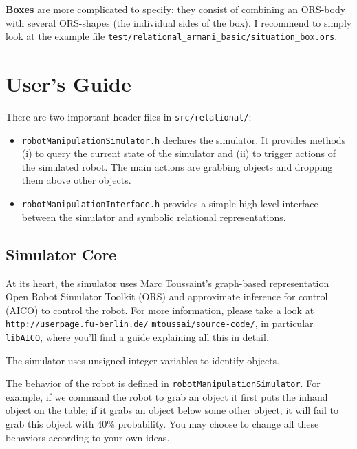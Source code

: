 \documentclass[10pt,twoside,twocolumn,fleqn]{article}
\begin{document}
\textbf{Boxes} are more complicated to specify: they consist of
combining an ORS-body with several ORS-shapes (the individual sides of
the box). I recommend to simply look at the example file
\texttt{test/relational\_armani\_basic/situation\_box.ors}.




\section{User's Guide}

There are two important header files in \texttt{src/relational/}:
\begin{itemize}
\item \texttt{robotManipulationSimulator.h} declares the simulator. It
provides methods (i) to query the current state of the simulator and
(ii) to trigger actions of the simulated robot. The main actions are
grabbing objects and dropping them above other objects.

\item \texttt{robotManipulationInterface.h} provides a simple high-level
interface between the simulator and symbolic relational representations.
\end{itemize}



\subsection{Simulator Core}

At its heart, the simulator uses Marc Toussaint's graph-based
representation Open Robot Simulator Toolkit (ORS) and approximate
inference for control (AICO) \citep{toussaint:09-icml} to control the
robot. For more information, please take a look at 
\texttt{http://userpage.fu-berlin.de/}
\texttt{mtoussai/source-code/}, in
particular \texttt{libAICO}, where you'll find a guide explaining all
this in detail.

The simulator uses unsigned integer variables to identify objects.

The behavior of the robot is defined in
\texttt{robotManipulationSimulator}. For example, if we command the
robot to grab an object it first puts the inhand object on the table; if
it grabs an object below some other object, it will fail to grab this
object with 40\% probability. You may choose to change all these
behaviors according to your own ideas.
\end{document}
